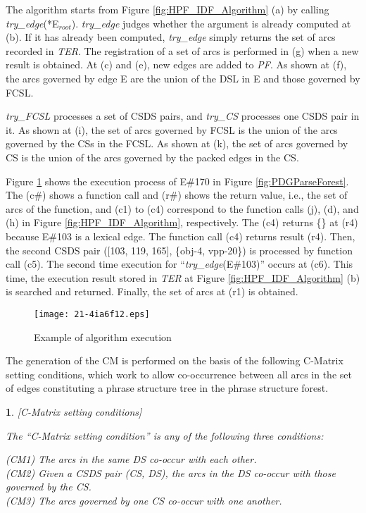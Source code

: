 \documentclass[english]{jnlp_1.4_rep}
\theoremstyle{break}
\theoremstyle{plain}
\theoremstyle{plain}
\newtheorem{definition}{}
\begin{document}
The algorithm starts from Figure \ref{fig:HPF_IDF_Algorithm} (a) by
calling \textit{try\_edge}(*E$_\mathit{root}$). \textit{try\_edge} judges whether the
argument is already computed at (b). If it has already been computed,
\textit{try\_edge} simply returns the set of arcs recorded in \textit{TER}. The
registration of a set of arcs is performed in (g) when a new result is
obtained. At (c) and (e), new edges are added to \textit{PF}. As shown at
(f), the arcs governed by edge E are the union of the DSL in E and
those governed by FCSL.

\textit{try\_FCSL} processes a set of CSDS pairs, and \textit{try\_CS} processes one CSDS
pair in it. As shown at (i), the set of arcs governed by FCSL is the
union of the arcs governed by the CSs in the FCSL. As shown at (k),
the set of arcs governed by CS is the union of the arcs governed by
the packed edges in the CS.

Figure \ref{fig:TryEdgeFunctionExecution} shows the execution process of
E\#170 in Figure \ref{fig:PDGParseForest}. The (c\#) shows a function
call and (r\#) shows the return value, i.e., the set of arcs of the
function, and (c1) to (c4) correspond to the function calls (j), (d),
and (h) in Figure \ref{fig:HPF_IDF_Algorithm}, respectively. The (c4)
returns \{\} at (r4) because E\#103 is a lexical edge. The function
call (c4) returns result (r4). Then, the second CSDS pair ([103, 119,
  165], \{obj-4, vpp-20\}) is processed by function call (c5). The
second time execution for ``\textit{try\_edge}(E\#103)'' occurs at
(c6). This time, the execution result stored in \textit{TER} at
Figure \ref{fig:HPF_IDF_Algorithm} (b) is searched and returned. Finally,
the set of arcs at (r1) is obtained.

\begin{figure}[b]
\vspace{-0.5\Cvs}
 \begin{center}
\texttt{[image: 21-4ia6f12.eps]}
 \end{center}
\caption{Example of algorithm execution}
\label{fig:TryEdgeFunctionExecution}
\end{figure}

The generation of the CM is performed on the basis of the following C-Matrix
setting conditions, which work to allow co-occurrence between all arcs
in the set of edges constituting a phrase structure tree in the phrase
structure forest.

\begin{definition} \label{def:CoocCondition} [C-Matrix setting conditions] 

The ``C-Matrix setting condition'' is any of the following three conditions:

\noindent
(CM1) The arcs in the same DS co-occur with each other.\\
(CM2) Given a CSDS pair (CS, DS), the arcs in the DS co-occur with those governed by the CS.\\
(CM3) The arcs governed by one CS co-occur with one another.

\end{definition}
\end{document}

